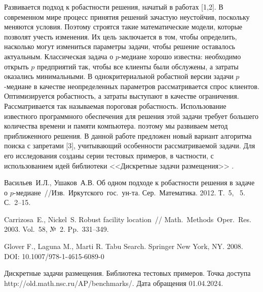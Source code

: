 Развивается подход к робастности решения, начатый в работах [1,2].  
 В современном мире процесс принятия решений зачастую неустойчив, поскольку меняются условия. Поэтому строятся такие математические модели, которые позволят учесть изменения. Их цель
заключается в том, чтобы определить, насколько могут измениться параметры задачи, чтобы решение оставалось актуальным. Классическая задача о $p$-медиане хорошо известна: необходимо открыть $p$ предприятий так, чтобы все клиенты были обслужены, а затраты оказались минимальными. В однокритериальной робастной версии задачи $p$-медиане
в качестве неопределенных  параметров рассматривается спрос клиентов. Оптимизируется робастность, а затраты выступают в качестве ограничения. Рассматривается так называемая пороговая робастность.  Использование известного программного обеспечения для решения этой задачи требует большего количества времени и памяти компьютера. поэтому мы развиваем метод приближенного решения.  В данной работе предложен новый вариант алгоритма поиска с запретами [3], учитывающий особенности рассматриваемой задачи. Для его исследования созданы серии тестовых примеров, в частности, с использованием идей библиотеки <<Дискретные задачи размещения>> \cite{math}.





\begin{thebibliography}{9} %
 Васильев~И.Л., Ушаков~А.В. Об одном подходе к робастности решения в задаче о $p$-медиане~//Изв.~Иркутского~гос.~ун-та. Сер.~Математика. 2012. Т.~5,  \textnumero~5. С.~2--15.

Carrizosa~E., Nickel~S. Robust facility location~// Math.~Methods~Oper.~Res. 2003. Vol.~58,
№~2. Pp.~331–349.

 Glover F., Laguna M., Marti R. Tabu Search. Springer New York, NY. 2008. DOI: 10.1007/978-1-4615-6089-0

 Дискретные задачи размещения. Библиотека тестовых примеров. Точка доступа
http://old.math.nsc.ru/AP/benchmarks/. Дата обращения 01.04.2024.



\end{thebibliography}






%

